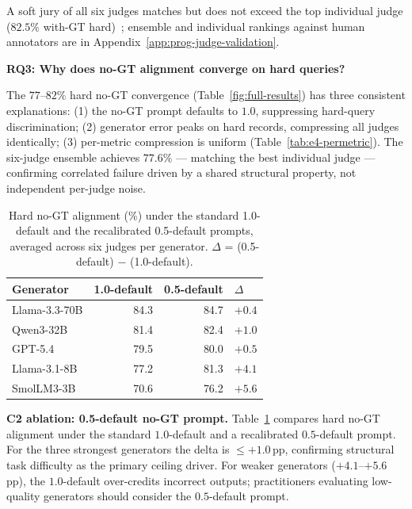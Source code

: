 A soft jury of all six judges matches but does not exceed the top individual judge ($82.5\%$ with-GT hard)~\cite{verga2024jury}; ensemble and individual rankings against human annotators are in Appendix~\ref{app:prog-judge-validation}.

\textbf{RQ3: Why does no-GT alignment converge on hard queries?}
\label{sec:exp:ceiling}

The $77$--$82\%$ hard no-GT convergence (Table~\ref{fig:full-results}) has three consistent explanations: (1) the no-GT prompt defaults to $1.0$, suppressing hard-query discrimination; (2) generator error peaks on hard records, compressing all judges identically; (3) per-metric compression is uniform (Table~\ref{tab:e4-permetric}). The six-judge ensemble achieves $77.6\%$ — matching the best individual judge — confirming correlated failure driven by a shared structural property, not independent per-judge noise.

\begin{table}
\vspace{-8pt}
\centering
\small
\setlength{\tabcolsep}{5pt}
\renewcommand{\arraystretch}{1.05}

\caption{Hard no-GT alignment (\%) under the standard 1.0-default and the recalibrated 0.5-default prompts, averaged across six judges per generator. $\Delta$ = (0.5-default) $-$ (1.0-default).}
\label{tab:c2-ceiling}

\begin{tabular}{@{}lrrl@{}}
\toprule
\textbf{Generator} & \textbf{1.0-default} & \textbf{0.5-default} & \textbf{$\Delta$} \\
\midrule
Llama-3.3-70B & 84.3 & 84.7 & $+0.4$ \\
Qwen3-32B     & 81.4 & 82.4 & $+1.0$ \\
GPT-5.4       & 79.5 & 80.0 & $+0.5$ \\
Llama-3.1-8B  & 77.2 & 81.3 & $+4.1$ \\
SmolLM3-3B    & 70.6 & 76.2 & $+5.6$ \\
\bottomrule
\end{tabular}

\vspace{-10pt}
\end{table}

\textbf{C2 ablation: 0.5-default no-GT prompt.} Table~\ref{tab:c2-ceiling} compares hard no-GT alignment under the standard $1.0$-default and a recalibrated $0.5$-default prompt. For the three strongest generators the delta is ${\leq}{+1.0}$\,pp, confirming structural task difficulty as the primary ceiling driver. For weaker generators ($+4.1$--$+5.6$\,pp), the $1.0$-default over-credits incorrect outputs; practitioners evaluating low-quality generators should consider the $0.5$-default prompt.


